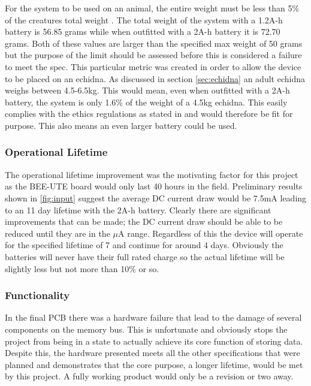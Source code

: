 \documentclass[12pt,openany,a4paper]{book}
\begin{document}
	For the system to be used on an animal, the entire weight must be less than 5\% of the creatures total weight \cite{Mamm87}. The total weight of the system with a 1.2A-h battery is 56.85 grams while when outfitted with a 2A-h battery it is 72.70 grams. Both of these values are larger than the specified max weight of 50 grams but the purpose of the limit should be assessed before this is considered a failure to meet the spec. This particular metric was created in order to allow the device to be placed on an echidna. As discussed in section \ref{sec:echidna} an adult echidna weighs between 4.5-6.5kg. This would mean, even when outfitted with a 2A-h battery, the system is only 1.6\% of the weight of a 4.5kg echidna. This easily complies with the ethics regulations as stated in \cite{Mamm87} and would therefore be fit for purpose. This also means an even larger battery could be used. \\
	
	\subsubsection{Operational Lifetime}
	The operational lifetime improvement was the motivating factor for this project as the BEE-UTE board would only last 40 hours in the field. Preliminary results shown in \ref{fig:input} suggest the average DC current draw would be 7.5mA leading to an 11 day lifetime with the 2A-h battery. Clearly there are significant improvements that can be made; the DC current draw should be able to be reduced until they are in the $\mu$A range. Regardless of this the device will operate for the specified lifetime of 7 and continue for around 4 days. Obviously the batteries will never have their full rated charge so the actual lifetime will be slightly less but not more than 10\% or so. \\
	
	\subsubsection{Functionality}
	In the final PCB there was a hardware failure that lead to the damage of several components on the memory bus. This is unfortunate and obviously stops the project from being in a state to actually achieve its core function of storing data. \\
	
	Despite this, the hardware presented meets all the other specifications that were planned and demonstrates that the core purpose, a longer lifetime, would be met by this project. A fully working product would only be a revision or two away. \\
	
\end{document}
